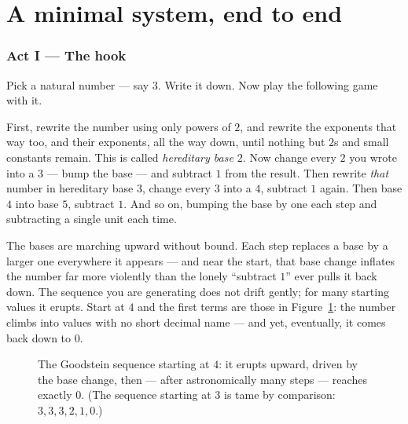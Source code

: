 \documentclass[11pt]{article}
\begin{document}
\part{A minimal system, end to end}

\section{Act I --- The hook}

Pick a natural number --- say $3$. Write it down. Now play the following
game with it.

First, rewrite the number using only powers of $2$, and rewrite the
exponents that way too, and their exponents, all the way down, until nothing
but $2$s and small constants remain. This is called \emph{hereditary base
$2$}. Now change every $2$ you wrote into a $3$ --- bump the base --- and
subtract $1$ from the result. Then rewrite \emph{that} number in hereditary
base $3$, change every $3$ into a $4$, subtract $1$ again. Then base $4$ into
base $5$, subtract $1$. And so on, bumping the base by one each step and
subtracting a single unit each time.

The bases are marching upward without bound. Each step replaces a base by a
larger one everywhere it appears --- and near the start, that base change
inflates the number far more violently than the lonely ``subtract $1$'' ever
pulls it back down. The sequence you are generating does not drift gently;
for many starting values it erupts. Start at $4$ and the first terms are
those in Figure~\ref{fig:erupt}: the number climbs into values with no short
decimal name --- and yet, eventually, it comes back down to $0$.

\begin{figure}[h]
\centering
{}
\caption{The Goodstein sequence starting at $4$: it erupts upward, driven by
the base change, then --- after astronomically many steps --- reaches
exactly $0$. (The sequence starting at $3$ is tame by comparison:
$3,3,3,2,1,0$.)}
\label{fig:erupt}
\end{figure}
\end{document}
